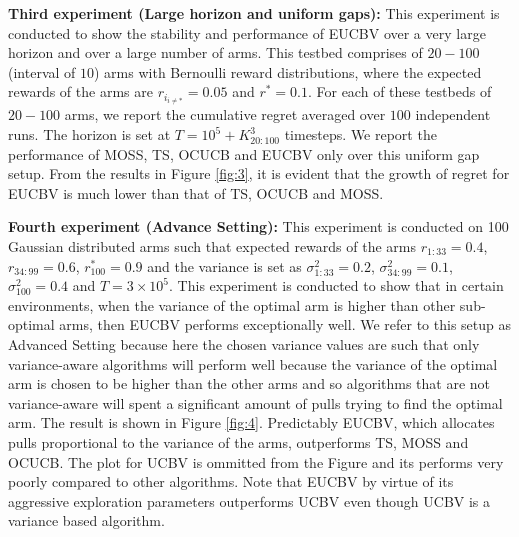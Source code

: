 \textbf{Third experiment (Large horizon and uniform gaps):} This experiment is conducted to show the stability and performance of EUCBV over a very large horizon and over a large number of arms. This testbed comprises of $20-100$ (interval of $10$) arms with Bernoulli reward distributions, where the expected rewards of the arms are $r_{i_{{i}\neq {*}}}=0.05$ and $r^{*}=0.1$. For each of these testbeds of $20-100$ arms, we report the cumulative regret averaged over $100$ independent runs. The horizon is set at $T=10^{5} + K_{20:100}^{3}$ timesteps. We report the performance of MOSS, TS, OCUCB and EUCBV only over this uniform gap setup. From the results in Figure \ref{fig:3}, it is evident that the growth of regret for EUCBV  is much lower than that of TS, OCUCB and MOSS. 


\textbf{Fourth experiment (Advance Setting):} This experiment is conducted on 100 Gaussian distributed arms such that expected rewards of the arms $r_{1:33}=0.4$, $r_{34:99}=0.6$, $r^{*}_{100}=0.9$ and the variance is set as $\sigma_{1:33}^{2}=0.2$, $\sigma_{34:99}^{2}=0.1$,  $\sigma_{100}^{2}=0.4$ and $T=3\times 10^5$. This experiment is conducted to show that in certain environments, when the variance of the optimal arm is higher than other sub-optimal arms, then EUCBV performs exceptionally well. We refer to this setup as Advanced Setting because here the chosen variance values are such that only variance-aware algorithms will perform well because the variance of the optimal arm is chosen to be higher than the other arms and so algorithms that are not variance-aware will spent a significant amount of pulls trying to find the optimal arm. The result is shown in Figure \ref{fig:4}. Predictably EUCBV, which allocates pulls proportional to the variance of the arms, outperforms TS, MOSS and OCUCB. The plot for UCBV is ommitted from the Figure and its performs very poorly compared to other algorithms. Note that EUCBV by virtue of its aggressive exploration parameters outperforms UCBV even though UCBV is a variance based algorithm.



